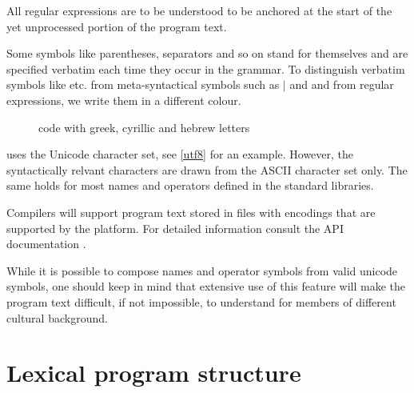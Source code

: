 All regular expressions are to be understood to be anchored at the start of the yet unprocessed portion of the program text.

\par Some symbols like parentheses, separators and so on stand for themselves and are specified verbatim each time they occur in the grammar. To distinguish verbatim symbols like \sym{<- , ; ::} etc. from meta-syntactical symbols such as {\Large $|$} and  and from regular expressions, we write them in a different colour.

\begin{figure}[bth]
\epsfxsize\hsize {}
\caption{\frege{} code with greek, cyrillic and hebrew letters}
\label{utf8}
\end{figure}

\par \frege{} uses the Unicode character set, see \autoref{utf8} for an
example. However, the syntactically relvant characters are drawn from
the ASCII character set only. The same holds for most names and operators defined in
the standard libraries. 

Compilers will support program text stored in files with encodings
that are supported by the \java{} platform.
For detailed information consult the \java{}
API documentation \cite{apidoc}. 

While it is possible to compose names and operator symbols from
valid unicode symbols, one should keep in mind that extensive use of
this feature will make the program text
difficult, if not impossible, to understand for members of different
cultural background.

\section{Lexical program structure}

\begin{flushleft}
 \\
  \\
 \\
  \oder {} \oder {} \oder {} \oder {} \oder {}
\\\hspace{0.5in} \oder {} \oder {}
\end{flushleft}

